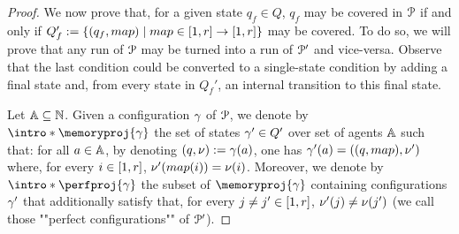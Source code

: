 \begin{proof}
	We now prove that, for a given state $q_f \in Q$, $q_f$ may be covered in $\mathcal{P}$ if and only if $Q_f' := \set{(q_f, \map) \mid \map \in \nset{1}{r} \to \nset{1}{r}}$ may be covered. To do so, we will prove that any run of $\mathcal{P}$ may be turned into a run of $\mathcal{P}'$ and vice-versa. Observe that the last condition could be converted to a single-state \COVER condition by adding a final state and, from every state in $Q_f'$, an internal transition to this final state.
  
	Let $\mathbb{A} \subseteq \mathbb{N}$.
	Given a configuration $\gamma$ of $\mathcal{P}$, we denote by \AP $\intro*\memoryproj{\config}$ 
	the set of states $\gamma' \in Q'$ over set of agents $\mathbb{A}$ such that:
	 for all $a \in \mathbb{A}$, by denoting $(q, \nu):= \gamma(a)$, one has $\config'(a) = ((q, \map), \localdata')$ where, for every $i \in [1,r]$, $\localdata'(\map(i)) = \localdata(i)$. 
	Moreover, we denote by \AP $\intro*\perfproj{\config}$ 
	the subset of $\memoryproj{\config}$ containing configurations 
	$\gamma'$ that additionally satisfy that, for every $j \ne j' \in [1,r]$, $\nu'(j) \ne \nu(j')$ (we call those ""perfect configurations"" of $\mathcal{P}'$).


\end{proof}
